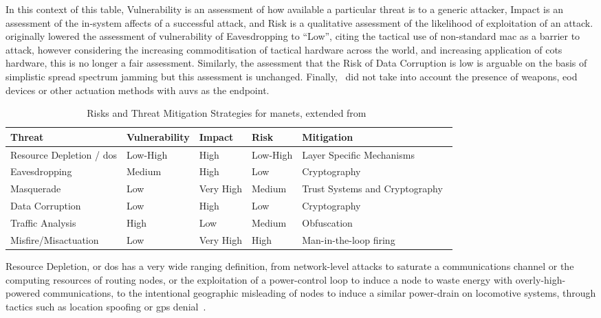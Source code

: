 In this context of this table, Vulnerability is an assessment of how available a particular threat is to a generic attacker, Impact is an assessment of the in-system affects of a successful attack, and Risk is a qualitative assessment of the likelihood of exploitation of an attack.
\citet{Kidston2010} originally lowered the assessment of vulnerability of Eavesdropping to ``Low'', citing the tactical use of non-standard \gls{mac} as a barrier to attack, however considering the increasing commoditisation of tactical hardware across the world, and increasing application of \gls{cots} hardware, this is no longer a fair assessment.
Similarly, the assessment that the Risk of Data Corruption is low is arguable on the basis of simplistic spread spectrum jamming but this assessment is unchanged.
Finally,~\citet{Kidston2010} did not take into account the presence of weapons, \gls{eod} devices or other actuation methods with \glspl{auv} as the endpoint.

\begin{table}
	\caption[Risks and Threat Mitigation Strategies for MANETs]{Risks and Threat Mitigation Strategies for \glspl{manet}, extended from~\citet{Kidston2010}}
	\label{tab:manet_risk}
	\begin{tabularx}{\textwidth}{p{3cm} X X X >{\raggedright\arraybackslash}p{4cm}}\toprule
		Threat & Vulnerability & Impact & Risk & Mitigation	\\\midrule
		Resource Depletion / \gls{dos} & Low-High & High & Low-High & Layer Specific Mechanisms~\cite{Wu2007,Nwaocha2015}\\
		Eavesdropping & Medium & High & Low & Cryptography~\cite{Chen2010}\\
		Masquerade & Low & Very High & Medium & Trust Systems and Cryptography~\cite{Wang2009a}\\
		Data Corruption & Low & High & Low & Cryptography\\
		Traffic Analysis & High & Low & Medium & Obfuscation~\cite{Huang2010}\\
		Misfire/Misactuation & Low & Very High & High & Man-in-the-loop firing~\cite{Caseley2009}\\
	\end{tabularx}
\end{table}

Resource Depletion, or \gls{dos} has a very wide ranging definition, from network-level attacks to saturate a communications channel or the computing resources of routing nodes, or the exploitation of a power-control loop to induce a node to waste energy with overly-high-powered communications, to the intentional geographic misleading of nodes to induce a similar power-drain on locomotive systems, through tactics such as location spoofing or \gls{gps} denial~\cite{Zuba2015}.

